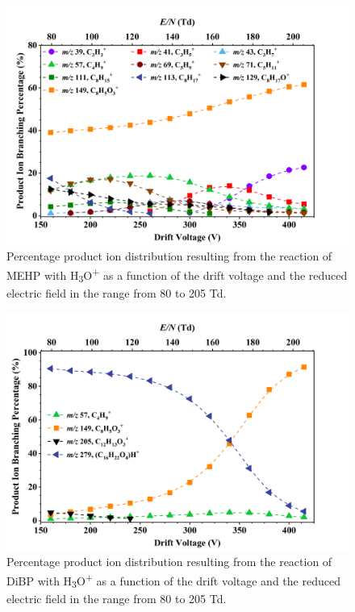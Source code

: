 \begin{figure}
\centering
\includegraphics[height=0.4\textheight]{pics/MEHP-BR.png}
\caption{Percentage product ion distribution resulting from the reaction of MEHP with H\textsubscript{3}O\textsuperscript{+} as a function of the drift voltage and the reduced electric field in the range from 80 to 205 Td.}
\label{fig:MEHP_fs}
\end{figure}


\begin{figure}
\centering
\includegraphics[height=0.4\textheight]{pics/DiBP-BR.png}
\caption{Percentage product ion distribution resulting from the reaction of DiBP with H\textsubscript{3}O\textsuperscript{+} as a function of the drift voltage and the reduced electric field in the range from 80 to 205 Td.}
\label{fig:DiBP_fs}
\end{figure}

